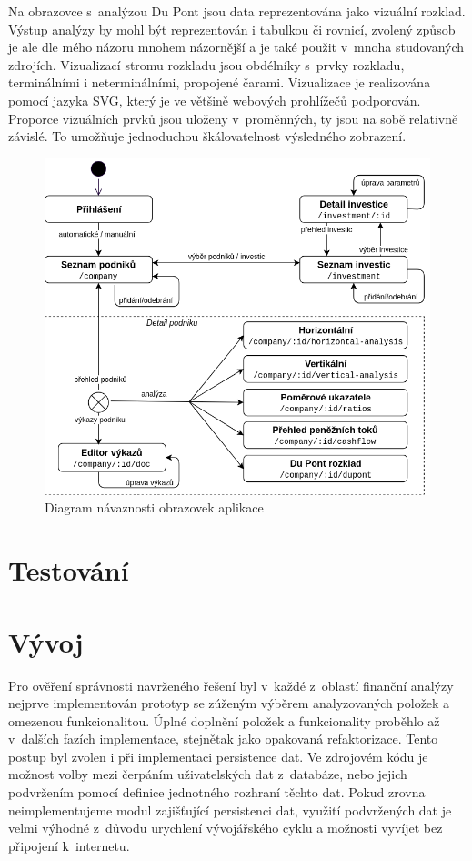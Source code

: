 Na obrazovce s~analýzou Du Pont jsou data reprezentována jako vizuální rozklad. Výstup analýzy by mohl být reprezentován i tabulkou či rovnicí, zvolený způsob je ale dle mého názoru mnohem názornější a je také použit v~mnoha studovaných zdrojích. Vizualizací stromu rozkladu jsou obdélníky s~prvky rozkladu, terminálními i neterminálními, propojené čarami. Vizualizace je realizována pomocí jazyka SVG, který je ve většině webových prohlížečů podporován. Proporce vizuálních prvků jsou uloženy v~proměnných, ty jsou na sobě relativně závislé. To umožňuje jednoduchou škálovatelnost výsledného zobrazení.

\begin{figure}[!htb]
  \centering
  \includegraphics[width=13.5cm]{img/screens.png}
  \caption{Diagram návaznosti obrazovek aplikace}
\end{figure}

\section{Testování}

\section{Vývoj}
Pro ověření správnosti navrženého řešení byl v~každé z~oblastí finanční analýzy nejprve implementován prototyp se zúženým výběrem analyzovaných položek a omezenou funkcionalitou. Úplné doplnění položek a funkcionality proběhlo až v~dalších fazích implementace, stejnětak jako opakovaná refaktorizace. Tento postup byl zvolen i při implementaci persistence dat. Ve zdrojovém kódu je možnost volby mezi čerpáním uživatelských dat z~databáze, nebo jejich podvržením pomocí definice jednotného rozhraní těchto dat. Pokud zrovna neimplementujeme modul zajišťující persistenci dat, využití podvržených dat je velmi výhodné z~důvodu urychlení vývojářského cyklu a možnosti vyvíjet bez připojení k~internetu.

